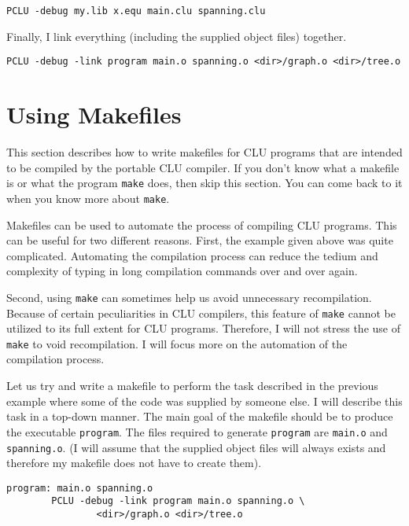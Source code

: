 \begin{indenttext}
  \verb|PCLU -debug my.lib x.equ main.clu spanning.clu|
\end{indenttext}

\noindent Finally, I link everything (including the supplied object
files) together.

\begin{indenttext}
  \verb|PCLU -debug -link program main.o spanning.o <dir>/graph.o <dir>/tree.o|
\end{indenttext}

\section{Using Makefiles}

This section describes how to write makefiles for CLU programs that
are intended to be compiled by the portable CLU compiler. If you don't
know what a makefile is or what the program \verb|make| does, then
skip this section. You can come back to it when you know more about
\verb|make|.

Makefiles can be used to automate the process of compiling CLU
programs. This can be useful for two different reasons. First, the
example given above was quite complicated. Automating the compilation
process can reduce the tedium and complexity of typing in long
compilation commands over and over again.

Second, using \verb|make| can sometimes help us avoid unnecessary
recompilation.  Because of certain peculiarities in CLU compilers,
this feature of \verb|make| cannot be utilized to its full extent for
CLU programs.  Therefore, I will not stress the use of \verb|make| to
void recompilation. I will focus more on the automation of the
compilation process.

Let us try and write a makefile to perform the task described in the
previous example where some of the code was supplied by someone else.
I will describe this task in a top-down manner.  The main goal of the
makefile should be to produce the executable \verb|program|. The files
required to generate \verb|program| are \verb|main.o| and
\verb|spanning.o|. (I will assume that the supplied object files
will always exists and therefore my makefile does not have to create
them).

\begin{indenttext}
\begin{verbatim}
program: main.o spanning.o
        PCLU -debug -link program main.o spanning.o \
                <dir>/graph.o <dir>/tree.o
\end{verbatim}
\end{indenttext}

